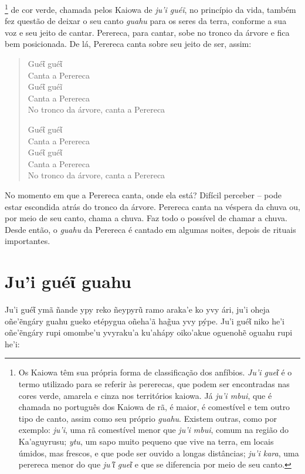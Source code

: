 \footnote{Os Kaiowa têm sua própria forma de classificação dos
  anfíbios. \emph{Ju'i gueῖ} é o termo utilizado para se referir às
  pererecas, que podem ser encontradas nas cores verde, amarela e cinza
  nos territórios kaiowa. Já \emph{ju'i mbui}, que é chamada no
  português dos Kaiowa de rã, é maior, é comestível e tem outro tipo de
  canto, assim como seu próprio \emph{guahu}. Existem outras, como por
  exemplo: \emph{ju'i}, uma rã comestível menor que \emph{ju'i mbui},
  comum na região do Ka'aguyrusu; \emph{ytu}, um sapo muito pequeno que
  vive na terra, em locais úmidos, mas frescos, e que pode ser ouvido a
  longas distâncias; \emph{ju'i kara}, uma perereca menor do que
  \emph{ju'ῖ gueῖ} e que se diferencia por meio de seu canto.} de cor
verde, chamada pelos Kaiowa de \emph{ju'i guéĩ}, no princípio da vida,
também fez questão de deixar o seu canto \emph{guahu} para os seres da
terra, conforme a sua voz e seu jeito de cantar. Perereca, para cantar,
sobe no tronco da árvore e fica bem posicionada. De lá, Perereca canta
sobre seu jeito de ser, assim:

\begin{verse}
Guéῖ guéῖ\\
Canta a Perereca\\
Guéῖ guéĩ\\
Canta a Perereca\\
No tronco da árvore, canta a Perereca

Guéῖ guéῖ\\
Canta a Perereca\\
Guéῖ guéῖ\\
Canta a Perereca\\
No tronco da árvore, canta a Perereca
\end{verse}

No momento em que a Perereca canta, onde ela está? Difícil perceber --
pode estar escondida atrás do tronco da árvore. Perereca canta na
véspera da chuva ou, por meio de seu canto, chama a chuva. Faz todo o
possível de chamar a chuva. Desde então, o \emph{guahu} da Perereca é
cantado em algumas noites, depois de rituais importantes.

\chapter{Ju'i guéῖ guahu}

Ju'i guéῖ ymã ñande ypy reko ñeypyrũ ramo araka'e ko yvy ári, ju'i oheja
oñe'ẽngáry guahu gueko etépygua oñeha'ã hag̃ua yvy pýpe. Ju'i guéῖ niko
he'i oñe'ẽngáry rupi omombe'u yvyraku'a ku'ahápy oiko'akue oguenohẽ
oguahu rupi he'i:


